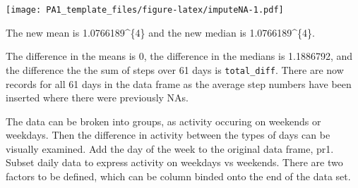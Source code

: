 \documentclass[]{article}
\newenvironment{Shaded}{\begin{snugshade}}{\end{snugshade}}
\newcommand{\KeywordTok}[1]{\textcolor[rgb]{0.13,0.29,0.53}{\textbf{#1}}}
\newcommand{\DataTypeTok}[1]{\textcolor[rgb]{0.13,0.29,0.53}{#1}}
\newcommand{\StringTok}[1]{\textcolor[rgb]{0.31,0.60,0.02}{#1}}
\newcommand{\OperatorTok}[1]{\textcolor[rgb]{0.81,0.36,0.00}{\textbf{#1}}}
\newcommand{\NormalTok}[1]{#1}
\begin{document}
\texttt{[image: PA1\_template\_files/figure-latex/imputeNA-1.pdf]}

\begin{Shaded}
\end{Shaded}

The new mean is 1.0766189\^{}\{4\} and the new median is
1.0766189\^{}\{4\}.

\begin{Shaded}
\end{Shaded}

The difference in the means is 0, the difference in the medians is
1.1886792, and the difference the the sum of steps over 61 days is
\texttt{total\_diff}. There are now records for all 61 days in the data
frame as the average step numbers have been inserted where there were
previously NAs.

The data can be broken into groups, as activity occuring on weekends or
weekdays. Then the difference in activity between the types of days can
be visually examined. Add the day of the week to the original data
frame, pr1. Subset daily data to express activity on weekdays vs
weekends. There are two factors to be defined, which can be column
binded onto the end of the data set.

\begin{Shaded}
\end{Shaded}
\end{document}
